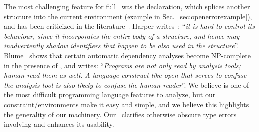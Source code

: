 \documentclass{jfp1}
\begin{document}
The most challenging feature for full \SML\ was the 
declaration, which splices another structure into the current
environment (example in Sec.~\ref{sec:openerrorexample}), and has been
criticized in the
literature~\cite{Appel:1993,Blume:1997,Blume:1999,Harper:2009}.
Harper writes~\cite{Harper:2009}:
``\emph{it is hard to control its behaviour, since
  it incorporates the entire body of a structure, and hence may
  inadvertently shadow identifiers that happen to be also used in the
  structure}''.
%
Blume~\cite{Blume:1997} shows that certain automatic dependency analyses
become NP-complete in the presence of , and writes:
``\emph{Programs are not only read by analysis tools; human read them
  as well.  A language construct like open that serves to confuse the
  analysis tool is also likely to confuse the human reader}''.
%
We believe  is one of the most difficult programming language
features to analyze, but our constraint/environments make it easy and
simple, and we believe this highlights the generality of our
machinery.
Our \TES\ clarifies otherwise obscure type errors involving 
and enhances its usability.



\end{document}

